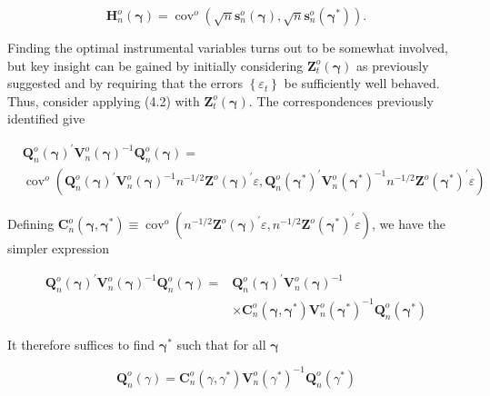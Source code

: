 \documentclass[10pt]{article}
\begin{document}
$$
\mathbf{H}_{n}^{o}(\boldsymbol{\gamma})=\operatorname{cov}^{o}\left(\sqrt{n} \mathbf{s}_{n}^{o}(\boldsymbol{\gamma}), \sqrt{n} \mathbf{s}_{n}^{o}\left(\boldsymbol{\gamma}^{*}\right)\right) .
$$

Finding the optimal instrumental variables turns out to be somewhat involved, but key insight can be gained by initially considering $\mathbf{Z}_{t}^{o}(\boldsymbol{\gamma})$ as previously suggested and by requiring that the errors $\left\{\varepsilon_{t}\right\}$ be sufficiently well behaved. Thus, consider applying (4.2) with $\mathbf{Z}_{t}^{o}(\boldsymbol{\gamma})$. The correspondences previously identified give

$$
\begin{aligned}
& \mathbf{Q}_{n}^{o}(\boldsymbol{\gamma})^{\prime} \mathbf{V}_{n}^{o}(\boldsymbol{\gamma})^{-1} \mathbf{Q}_{n}^{o}(\boldsymbol{\gamma})= \\
& \operatorname{cov}^{o}\left(\mathbf{Q}_{n}^{o}(\boldsymbol{\gamma})^{\prime} \mathbf{V}_{n}^{o}(\boldsymbol{\gamma})^{-1} n^{-1 / 2} \mathbf{Z}^{o}(\boldsymbol{\gamma})^{\prime} \varepsilon, \mathbf{Q}_{n}^{o}\left(\boldsymbol{\gamma}^{*}\right)^{\prime} \mathbf{V}_{n}^{o}\left(\boldsymbol{\gamma}^{*}\right)^{-1} n^{-1 / 2} \mathbf{Z}^{o}\left(\boldsymbol{\gamma}^{*}\right)^{\prime} \varepsilon\right)
\end{aligned}
$$

Defining $\mathbf{C}_{n}^{o}\left(\boldsymbol{\gamma}, \boldsymbol{\gamma}^{*}\right) \equiv \operatorname{cov}^{o}\left(n^{-1 / 2} \mathbf{Z}^{o}(\boldsymbol{\gamma})^{\prime} \varepsilon, n^{-1 / 2} \mathbf{Z}^{o}\left(\boldsymbol{\gamma}^{*}\right)^{\prime} \varepsilon\right)$, we have the simpler expression

$$
\begin{aligned}
\mathbf{Q}_{n}^{o}(\boldsymbol{\gamma})^{\prime} \mathbf{V}_{n}^{o}(\boldsymbol{\gamma})^{-1} \mathbf{Q}_{n}^{o}(\boldsymbol{\gamma})= & \mathbf{Q}_{n}^{o}(\boldsymbol{\gamma})^{\prime} \mathbf{V}_{n}^{o}(\boldsymbol{\gamma})^{-1} \\
& \times \mathbf{C}_{n}^{o}\left(\boldsymbol{\gamma}, \boldsymbol{\gamma}^{*}\right) \mathbf{V}_{n}^{o}\left(\boldsymbol{\gamma}^{*}\right)^{-1} \mathbf{Q}_{n}^{o}\left(\boldsymbol{\gamma}^{*}\right)
\end{aligned}
$$

It therefore suffices to find $\boldsymbol{\gamma}^{*}$ such that for all $\boldsymbol{\gamma}$

$$
\mathbf{Q}_{n}^{o}(\gamma)=\mathbf{C}_{n}^{o}\left(\gamma, \gamma^{*}\right) \mathbf{V}_{n}^{o}\left(\gamma^{*}\right)^{-1} \mathbf{Q}_{n}^{o}\left(\gamma^{*}\right)
$$
\end{document}
